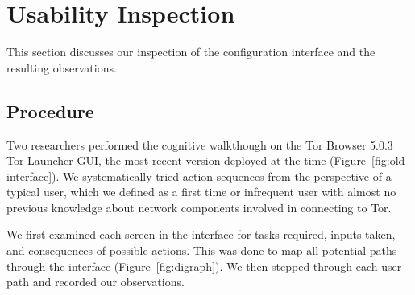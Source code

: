 \documentclass[USenglish,oneside,twocolumn]{article}
\begin{document}
\section{Usability Inspection}
\label{sec:inspection}
This section discusses our inspection of the configuration interface and the resulting observations.

\subsection{Procedure} 
Two researchers performed the cognitive walkthough on the Tor Browser 5.0.3 Tor Launcher GUI, the most recent version deployed at the time (Figure~\ref{fig:old-interface}). We systematically tried action sequences from the perspective of a typical user, which we defined as a first time or infrequent user with almost no previous knowledge about network components involved in connecting to Tor.

We first examined each screen in the interface for tasks required, inputs taken, and consequences of possible actions. This was done to map all potential paths through the interface (Figure~\ref{fig:digraph}). We then stepped through each user path and recorded our observations. 
\end{document}
